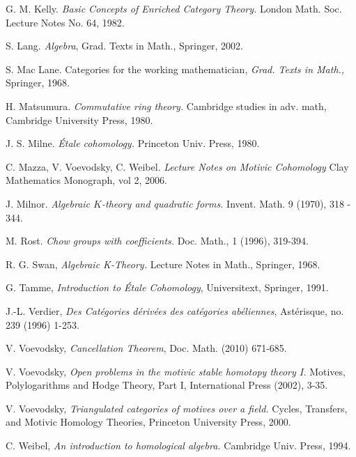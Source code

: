 \begin{thebibliography}{10}
G. M. Kelly.
\emph{Basic Concepts of Enriched Category Theory.}
London Math. Soc. Lecture Notes No. 64, 1982.

S. Lang.
\emph{Algebra}, Grad. Texts in Math.,
Springer, 2002.

S. Mac Lane.
Categories for the working mathematician, 
{\em Grad. Texts in Math.,} Springer, 1968.

H. Matsumura.
\emph{Commutative ring theory.}
Cambridge studies in adv. math,
Cambridge University Press, 1980.

J. S. Milne.
\emph{\'Etale cohomology.} 
Princeton Univ. Press, 1980.

C. Mazza, V. Voevodsky, C. Weibel.
\emph{Lecture Notes on Motivic Cohomology}
Clay Mathematics Monograph, vol 2, 2006.

J. Milnor.
\emph{Algebraic $K$-theory and quadratic forms.}
Invent. Math. 9 (1970), 318 - 344.

M. Rost.
\emph{Chow groups with coefficients.}
Doc. Math., 1 (1996), 319-394.

R. G. Swan,
\emph{Algebraic K-Theory.}
Lecture Notes in Math.,
Springer, 1968.

G. Tamme,
\emph{Introduction to \'Etale Cohomology},
Universitext,
Springer, 1991.

J.-L. Verdier, \emph{Des Cat\'egories d\'eriv\'ees des cat\'egories
ab\'eliennes},
Ast\'erisque, no. 239 (1996) 1-253.

V. Voevodsky,
\emph{Cancellation Theorem},
Doc. Math. (2010) 671-685.

V. Voevodsky,
{\em Open problems in the motivic stable homotopy theory I.}
Motives, Polylogarithms and Hodge Theory, Part I,
International Press (2002), 3-35.

V. Voevodsky,
\emph{Triangulated categories of motives over a field.}
Cycles, Transfers, and Motivic Homology Theories,
Princeton University Press, 2000.

C. Weibel,
\emph{An introduction to homological algebra.}
Cambridge Univ. Press, 1994.
\end{thebibliography}
